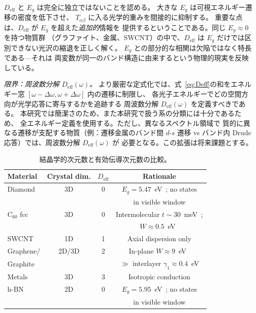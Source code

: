 \documentclass[twocolumn,showpacs,preprintnumbers,amsmath,amssymb,prb]{revtex4-2}
\begin{document}
$D_\mathrm{eff}$ と $E_g$ は完全に独立ではないことを認める。
大きな $E_g$ は可視エネルギー遷移の密度を低下させ、
$T_{\alpha\beta}$ に入る光学的重みを間接的に抑制する。
重要な点は、$D_\mathrm{eff}$ が $E_g$ を超えた\emph{追加的}情報を
提供するということである。同じ $E_g \approx 0$ を持つ物質群
（グラファイト、金属、SWCNT）の中で、$D_\mathrm{eff}$ は
$E_g$ だけでは区別できない光沢の縮退を正しく解く。
$E_g$ との部分的な相関は欠陥ではなく特長である---それは
両変数が同一のバンド構造に由来するという物理的現実を反映している。

\emph{限界：周波数分解 $D_\mathrm{eff}(\omega)$。}
より厳密な定式化では、式~\ref{eq:Deff}の和をエネルギー窓
$[\omega - \Delta\omega, \omega + \Delta\omega]$ 内の遷移に制限し、
各光子エネルギーでどの空間方向が光学応答に寄与するかを追跡する
周波数分解 $D_\mathrm{eff}(\omega)$ を定義すべきである。
本研究では簡潔さのため、また本研究で扱う系の分類には十分であるため、
全エネルギー定義を使用する。ただし、異なるスペクトル領域で
質的に異なる遷移が支配する物質（例：遷移金属のバンド間 $d$-$s$ 遷移
vs バンド内 Drude 応答）では、周波数分解 $D_\mathrm{eff}(\omega)$ が
必要となる。この拡張は将来課題とする。

\begin{table}[h]
\caption{結晶学的次元数と有効伝導次元数の比較。}
\label{tab:Deff}
\begin{ruledtabular}
\begin{tabular}{lccc}
  Material & Crystal dim. & $D_\mathrm{eff}$ & Rationale \\
  \hline
  Diamond      & 3D     & 0 & $E_g = 5.47$~eV~\cite{Clark1964}; no states \\
               &        &   & in visible window \\
  C$_{60}$ fcc & 3D     & 0 & Intermolecular $t \sim 30$~meV~\cite{Hebard1991}; \\
               &        &   & $W \approx 0.5$~eV~\cite{Gunnarsson1997} \\
  SWCNT        & 1D     & 1 & Axial dispersion only \\
  Graphene/    & 2D/3D  & 2 & In-plane $W \approx 9$~eV~\cite{Reich2002} \\
  \quad Graphite &      &   & $\gg$ interlayer $\gamma_1 \approx 0.4$~eV \\
  Metals       & 3D     & 3 & Isotropic conduction \\
  h-BN         & 2D     & 0 & $E_g = 5.95$~eV~\cite{Cassabois2016}; no states \\
               &        &   & in visible window \\
\end{tabular}
\end{ruledtabular}
\end{table}
\end{document}
